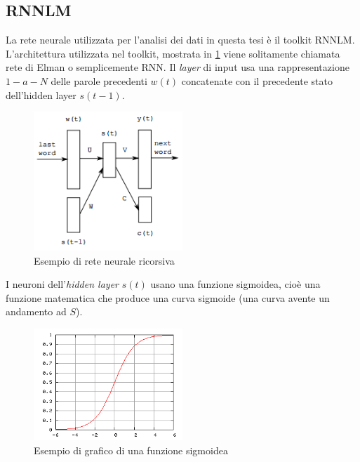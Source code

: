 \documentclass[a4paper,12pt,openright,twoside]{report}
\theoremstyle{definition}
\begin{document}
\subsection{RNNLM}
La rete neurale utilizzata per l'analisi dei dati in questa tesi è il toolkit RNNLM. 
L'architettura utilizzata nel toolkit, mostrata in \ref{fig:rnnlm} viene solitamente chiamata rete di Elman o semplicemente RNN. 
Il \emph{layer} di input usa una rappresentazione $1-a-N$ delle 
parole precedenti $w(t)$ concatenate con il precedente stato dell'hidden layer $s(t - 1)$.
\begin{figure}[ht]
  \centering
      \includegraphics[width=0.5\textwidth]{Immagini/rnnlm_rete.png}
      \caption{Esempio di rete neurale ricorsiva}
\label{fig:rnnlm}
\end{figure}

I neuroni dell'\emph{hidden layer} $s(t)$ usano una funzione sigmoidea, cioè una funzione matematica
che produce una curva sigmoide (una curva avente un andamento ad $S$).

\begin{figure}[ht]
  \centering
      \includegraphics[width=0.5\textwidth]{Immagini/sigmoide.png}
      \caption{Esempio di grafico di una funzione sigmoidea}
\label{fig:sigmoide}
\end{figure}
\end{document}
